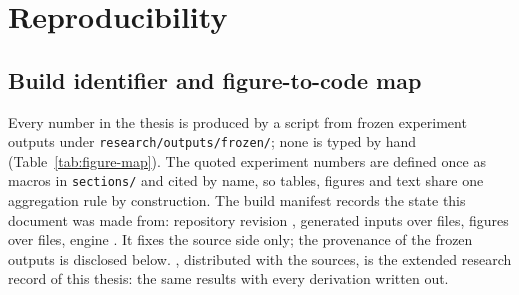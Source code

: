
\chapter{Reproducibility}\label{app:repro}\label{app:aggregation}\label{app:aggregation-chapter}

\setlength{\emergencystretch}{2em}

\section{Build identifier and figure-to-code map}

Every number in the thesis is produced by a script from frozen experiment
outputs under \texttt{research/outputs/frozen/}; none is typed by hand
(Table~\ref{tab:figure-map}). The quoted experiment numbers are defined once
as macros in \texttt{sections/} and cited by name, so tables, figures and
text share one aggregation rule by construction. The build manifest records
the state this document was made from: repository revision \bmreposha{},
generated inputs \bmgenerated{} over \bmgeneratedcount{} files, figures
\bmfigures{} over \bmfigurecount{} files, engine \bmtectonic{}. It fixes the
source side only; the provenance of the frozen outputs is disclosed below.
\Compendium{}, distributed with the sources, is the extended research record
of this thesis: the same results with every derivation written out.


